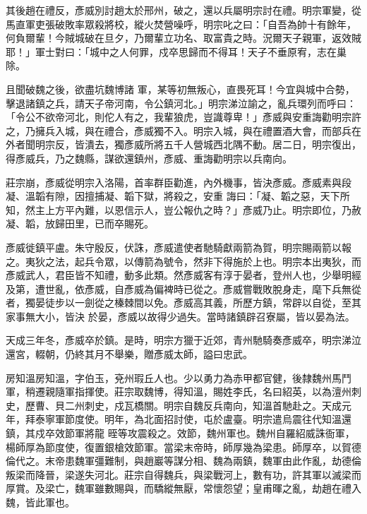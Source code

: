 \begin{pinyinscope}
 其後趙在禮反，彥威別討趙太於邢州，破之，還以兵屬明宗討在禮。明宗軍變，從馬直軍吏張破敗率眾殺將校，縱火焚營噪呼，明宗叱之曰：「自吾為帥十有餘年，何負爾輩！今賊城破在旦夕，乃爾輩立功名、取富貴之時。況爾天子親軍，返效賊耶！」軍士對曰：「城中之人何罪，戍卒思歸而不得耳！天子不垂原宥，志在巢除。



 且聞破魏之後，欲盡坑魏博諸
 軍，某等初無叛心，直畏死耳！今宜與城中合勢，擊退諸鎮之兵，請天子帝河南，令公鎮河北。」明宗涕泣諭之，亂兵環列而呼曰：「令公不欲帝河北，則佗人有之，我輩狼虎，豈識尊卑！」彥威與安重誨勸明宗許之，乃擁兵入城，與在禮合，彥威獨不入。明宗入城，與在禮置酒大會，而部兵在外者聞明宗反，皆潰去，獨彥威所將五千人營城西北隅不動。居二日，明宗復出，得彥威兵，乃之魏縣，謀欲還鎮州，彥威、重誨勸明宗以兵南向。



 莊宗崩，彥威從明宗入洛陽，首率群臣勸進，內外機事，皆決彥威。彥威素與段凝、溫韜有隙，因擅捕凝、韜下獄，將殺之，安重
 誨曰：「凝、韜之惡，天下所知，然主上方平內難，以恩信示人，豈公報仇之時？」彥威乃止。明宗即位，乃赦凝、韜，放歸田里，已而卒賜死。



 彥威徙鎮平盧。朱守殷反，伏誅，彥威遣使者馳騎獻兩箭為賀，明宗賜兩箭以報之。夷狄之法，起兵令眾，以傳箭為號令，然非下得施於上也。明宗本出夷狄，而彥威武人，君臣皆不知禮，動多此類。然彥威客有淳于晏者，登州人也，少舉明經及第，遭世亂，依彥威，自彥威為偏裨時已從之。彥威嘗戰敗脫身走，麾下兵無從者，獨晏徒步以一劍從之榛棘間以免。彥威高其義，所歷方鎮，常辟以自從，至其家事無大小，皆決
 於晏，彥威以故得少過失。當時諸鎮辟召寮屬，皆以晏為法。



 天成三年冬，彥威卒於鎮。是時，明宗方獵于近郊，青州馳騎奏彥威卒，明宗涕泣還宮，輟朝，仍終其月不舉樂，贈彥威太師，謚曰忠武。



 房知溫房知溫，字伯玉，兗州瑕丘人也。少以勇力為赤甲都官健，後隸魏州馬鬥軍，稍遷親隨軍指揮使。莊宗取魏博，得知溫，賜姓李氏，名曰紹英，以為澶州刺史，歷曹、貝二州刺史，戍瓦橋關。明宗自魏反兵南向，知溫首馳赴之。天成元年，拜泰寧軍節度使。明年，為北面招討使，屯於盧臺。明宗遣烏震往代知溫還鎮，其戍卒效節軍將龍
 晊等攻震殺之。效節，魏州軍也。魏州自羅紹威誅衙軍，楊師厚為節度使，復置銀槍效節軍。當梁末帝時，師厚幾為梁患。師厚卒，以賀德倫代之。末帝患魏軍彊難制，與趙巖等謀分相、魏為兩鎮，魏軍由此作亂，劫德倫叛梁而降晉，梁遂失河北。莊宗自得魏兵，與梁戰河上，數有功，許其軍以滅梁而厚賞。及梁亡，魏軍雖數賜與，而驕縱無厭，常懷怨望；皇甫暉之亂，劫趙在禮入魏，皆此軍也。




\end{pinyinscope}

